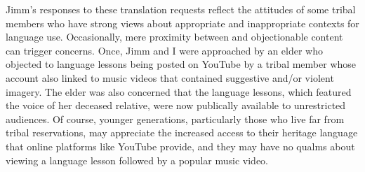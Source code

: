 \documentclass[output=paper]{LSP/langsci}
\begin{document}
Jimm's responses to these translation requests reflect the attitudes of some tribal members who have strong views about appropriate and inappropriate contexts for  language use. Occasionally, mere proximity between  and objectionable content can trigger concerns. Once, Jimm and I were approached by an elder who objected to  language lessons being posted on YouTube by a tribal member whose account also linked to music videos that contained suggestive and/or violent imagery. The elder was also concerned that the language lessons, which featured the voice of her deceased relative, were now publically available to unrestricted audiences. Of course, younger generations, particularly those who live far from tribal reservations, may appreciate the increased access to their heritage language that online platforms like YouTube provide, and they may have no qualms about viewing a  language lesson followed by a popular music video.
\end{document}
